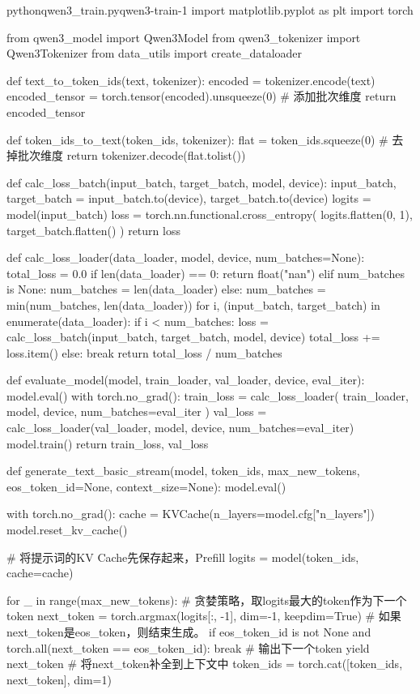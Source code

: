 \documentclass[lang=cn,newtx,10pt,scheme=chinese]{elegantbook}
\begin{document}
\begin{codebox}{python}{qwen3\_train.py}{qwen3-train-1}
import matplotlib.pyplot as plt
import torch

from qwen3_model import Qwen3Model
from qwen3_tokenizer import Qwen3Tokenizer
from data_utils import create_dataloader

def text_to_token_ids(text, tokenizer):
    encoded = tokenizer.encode(text)
    encoded_tensor = torch.tensor(encoded).unsqueeze(0)  # 添加批次维度
    return encoded_tensor

def token_ids_to_text(token_ids, tokenizer):
    flat = token_ids.squeeze(0)  # 去掉批次维度
    return tokenizer.decode(flat.tolist())

def calc_loss_batch(input_batch, target_batch, model, device):
    input_batch, target_batch = input_batch.to(device), target_batch.to(device)
    logits = model(input_batch)
    loss = torch.nn.functional.cross_entropy(
        logits.flatten(0, 1), target_batch.flatten()
    )
    return loss

def calc_loss_loader(data_loader, model, device, num_batches=None):
    total_loss = 0.0
    if len(data_loader) == 0:
        return float("nan")
    elif num_batches is None:
        num_batches = len(data_loader)
    else:
        num_batches = min(num_batches, len(data_loader))
    for i, (input_batch, target_batch) in enumerate(data_loader):
        if i < num_batches:
            loss = calc_loss_batch(input_batch, target_batch, model, device)
            total_loss += loss.item()
        else:
            break
    return total_loss / num_batches

def evaluate_model(model, train_loader, val_loader, device, eval_iter):
    model.eval()
    with torch.no_grad():
        train_loss = calc_loss_loader(
            train_loader, model, device, num_batches=eval_iter
        )
        val_loss = calc_loss_loader(val_loader, model, device, num_batches=eval_iter)
    model.train()
    return train_loss, val_loss

def generate_text_basic_stream(model, token_ids, max_new_tokens, eos_token_id=None, context_size=None):
    model.eval()

    with torch.no_grad():
        cache = KVCache(n_layers=model.cfg["n_layers"])
        model.reset_kv_cache()

        # 将提示词的KV Cache先保存起来，Prefill
        logits = model(token_ids, cache=cache)

        for _ in range(max_new_tokens):
            # 贪婪策略，取logits最大的token作为下一个token
            next_token = torch.argmax(logits[:, -1], dim=-1, keepdim=True)
            # 如果next_token是eos_token，则结束生成。
            if eos_token_id is not None and torch.all(next_token == eos_token_id):
                break
            # 输出下一个token
            yield next_token
            # 将next_token补全到上下文中
            token_ids = torch.cat([token_ids, next_token], dim=1)


\end{codebox}
\end{document}
